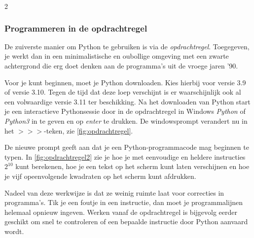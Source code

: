 \begin{multicols}{2}
	\subsubsection*{Programmeren in de opdrachtregel}
	De zuiverste manier om Python te gebruiken is via de \emph{opdrachtregel}. Toegegeven, je werkt dan in een minimalistische en oubollige omgeving met een zwarte achtergrond die erg doet denken aan de programma's uit de vroege jaren '90. 
	
	Voor je kunt beginnen, moet je Python \mbox{downloaden}. Kies hierbij voor versie 3.9 of versie 3.10. Tegen de tijd dat deze loep verschijnt is er waarschijnlijk ook al een volwaardige versie 3.11 ter beschikking. Na het downloaden van Python start je een interactieve Pythonsessie door in de opdrachtregel in Windows \emph{Python} of \emph{Python3} in te geven en op \emph{enter} te drukken. De windowsprompt verandert nu in het $>>>$-teken, zie \autoref{fig:opdrachtregel}. 
	
	De nieuwe prompt geeft aan dat je een Python-programmacode mag beginnen te typen. In \autoref{fig:opdrachtregel2} zie je hoe je met eenvoudige en heldere instructies $2^{10}$ kunt berekenen, hoe je een tekst op het scherm kunt laten verschijnen en hoe je vijf opeenvolgende kwadraten op het scherm kunt afdrukken.
	
	Nadeel van deze werkwijze is dat ze weinig ruimte laat voor correcties in programma's. Tik je een foutje in een instructie, dan moet je programmalijnen helemaal opnieuw ingeven. Werken vanaf de opdrachtregel is bijgevolg eerder geschikt om snel te controleren of een bepaalde instructie door Python aanvaard wordt.
	
	\end{multicols}
